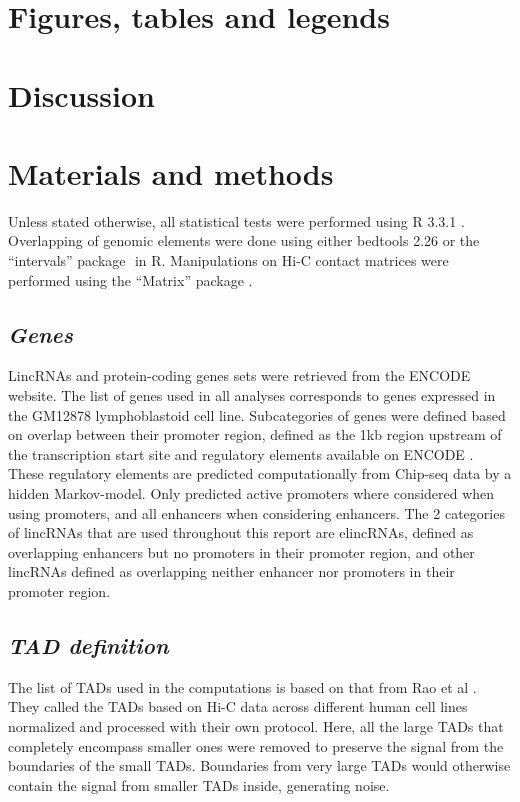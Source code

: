 \documentclass[11pt,a4paper]{report}
\begin{document}
\section*{Figures, tables and legends}


\section*{Discussion}
\section*{Materials and methods}
Unless stated otherwise, all statistical tests were performed using R 3.3.1 \cite{RCoreTeam2016}⁠. Overlapping of genomic elements were done using either bedtools 2.26 \cite{Quinlan2010}⁠or the “intervals” package \cite{Bourgon2015}⁠ in R. Manipulations on Hi-C contact matrices were performed using the “Matrix” package \cite{Bates2016}⁠.

\subsection*{\textit{Genes}}

LincRNAs and protein-coding genes sets were retrieved from the ENCODE website. The list of genes used in all analyses corresponds to genes expressed in the GM12878 lymphoblastoid cell line. Subcategories of genes were defined based on overlap between their promoter region, defined as the 1kb region upstream of the transcription start site and regulatory elements available on ENCODE \cite{ENCODEProject2012}⁠. These regulatory elements are predicted computationally from Chip-seq data by a hidden Markov-model. Only predicted active promoters where considered when using promoters, and all enhancers when considering enhancers. The 2 categories of lincRNAs that are used throughout this report are elincRNAs, defined as overlapping enhancers but no promoters in their promoter region, and other lincRNAs defined as overlapping neither enhancer nor promoters in their promoter region.


\subsection*{\textit{TAD definition}}

The list of TADs used in the computations is based on that from Rao et al \cite{Rao2014}. They called the TADs based on Hi-C data across different human cell lines normalized and processed with their own protocol. Here, all the large TADs that completely encompass smaller ones were removed to preserve the signal from the boundaries of the small TADs. Boundaries from very large TADs would otherwise contain the signal from smaller TADs inside, generating noise.
\end{document}

